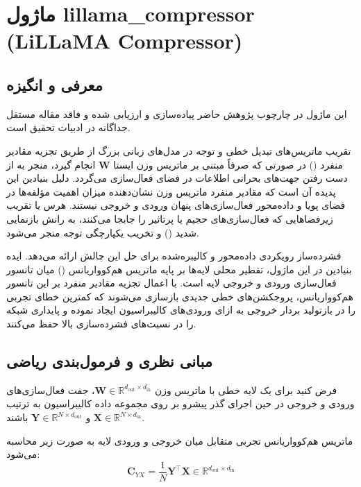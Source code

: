 \section{ماژول lillama\_compressor (LiLLaMA Compressor)}
\label{sec:module_lillama_compressor}

\subsection{معرفی و انگیزه}
این ماژول در چارچوب پژوهش حاضر پیاده‌سازی و ارزیابی شده و فاقد مقاله مستقل جداگانه در ادبیات تحقیق است.

تقریب ماتریس‌های تبدیل خطی و توجه در مدل‌های زبانی بزرگ از طریق تجزیه مقادیر منفرد () در صورتی که صرفاً مبتنی بر ماتریس وزن ایستا $\mathbf{W}$ انجام گیرد، منجر به از دست رفتن جهت‌های بحرانی اطلاعات در فضای فعال‌سازی می‌گردد. دلیل بنیادین این پدیده آن است که مقادیر منفرد ماتریس وزن نشان‌دهنده میزان اهمیت مؤلفه‌ها در فضای پویا و داده‌محور فعال‌سازی‌های پنهان ورودی و خروجی نیستند. هرس یا تقریب زیرفضاهایی که فعال‌سازی‌های حجیم یا پرتاثیر را جابجا می‌کنند، به رانش بازنمایی شدید () و تخریب یکپارچگی توجه منجر می‌شود.

فشرده‌ساز  رویکردی داده‌محور و کالیبره‌شده برای حل این چالش ارائه می‌دهد. ایده بنیادین در این ماژول، تقطیر محلی لایه‌ها بر پایه ماتریس هم‌کوواریانس () میان تانسور فعال‌سازی ورودی و خروجی لایه است. با اعمال تجزیه مقادیر منفرد بر این تانسور هم‌کوواریانس، پروجکشن‌های خطی جدیدی بازسازی می‌شوند که کمترین خطای تجربی را در بازتولید بردار خروجی به ازای ورودی‌های کالیبراسیون ایجاد نموده و پایداری شبکه را در نسبت‌های فشرده‌سازی بالا حفظ می‌کنند.

\subsection{مبانی نظری و فرمول‌بندی ریاضی}
فرض کنید برای یک لایه خطی با ماتریس وزن $\mathbf{W} \in \mathbb{R}^{d_{\text{out}} \times d_{\text{in}}}$، جفت فعال‌سازی‌های ورودی و خروجی در حین اجرای گذر پیشرو بر روی مجموعه داده کالیبراسیون به ترتیب $\mathbf{X} \in \mathbb{R}^{N \times d_{\text{in}}}$ و $\mathbf{Y} \in \mathbb{R}^{N \times d_{\text{out}}}$ باشند.

ماتریس هم‌کوواریانس تجربی متقابل میان خروجی و ورودی لایه به صورت زیر محاسبه می‌شود:
\begin{equation}
\mathbf{C}_{YX} = \frac{1}{N} \mathbf{Y}^\top \mathbf{X} \in \mathbb{R}^{d_{\text{out}} \times d_{\text{in}}}
\end{equation}

